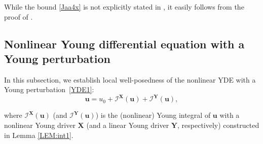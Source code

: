 \documentclass[letterpaper, 11pt,  reqno]{amsart}
\newcommand{\1}{\hspace{0.5mm}\textup{I}\hspace{0.5mm}}
\newcommand{\I}{\mathcal{I}}
\newcommand{\noi}{\noindent}
\newcommand{\uu}{\mathbf{u}}
\newcommand{\XX}{\mathbf{X}}
\newcommand{\YY}{\mathbf{Y}}
\numberwithin{equation}{section}
\numberwithin{theorem}{section}
\begin{document}
While the bound \eqref{Jaa4x}
is not explicitly stated in 
 \cite[Lemma~3.4]{CGLLO1}, 
 it easily follows from 
 the proof of 
 \cite[Lemma~3.4\,(iv)]{CGLLO1}.













\subsection{Nonlinear Young differential equation
with a Young perturbation}
\label{SUBSEC:Y3}


In this subsection, we establish local well-posedness
of the nonlinear YDE  with a Young 
perturbation~\eqref{YDE1}:
\begin{equation}
\label{YDE3x}
\uu = u_0 + \I^\XX(\uu) + \I^\YY(\uu), 
\end{equation}


\noi
where $\I^\XX(\uu)$ 
(and $\I^\YY(\uu)$) is the (nonlinear) Young integral of $\uu$
with a nonlinear Young driver $\XX$ 
(and a linear Young driver $\YY$, respectively) 
constructed in Lemma \ref{LEM:int1}.
\end{document}
